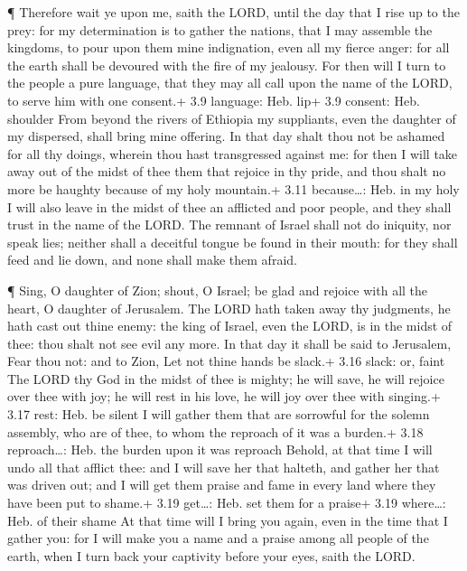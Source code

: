  ¶ Therefore wait ye upon me, saith the LORD, until the day
that I rise up to the prey: for my determination is to gather the
nations, that I may assemble the kingdoms, to pour upon them mine
indignation, even all my fierce anger: for all the earth shall be
devoured with the fire of my jealousy.  For then will I turn
to the people a pure language, that they may all call upon the name of
the LORD, to serve him with one consent.+ 3.9 language: Heb. lip+ 3.9
consent: Heb. shoulder  From beyond the rivers of Ethiopia
my suppliants, even the daughter of my dispersed, shall bring mine
offering.  In that day shalt thou not be ashamed for all
thy doings, wherein thou hast transgressed against me: for then I will
take away out of the midst of thee them that rejoice in thy pride, and
thou shalt no more be haughty because of my holy mountain.+ 3.11
because\ldots: Heb. in my holy  I will also leave in the
midst of thee an afflicted and poor people, and they shall trust in the
name of the LORD.  The remnant of Israel shall not do
iniquity, nor speak lies; neither shall a deceitful tongue be found in
their mouth: for they shall feed and lie down, and none shall make them
afraid.

 ¶ Sing, O daughter of Zion; shout, O Israel; be glad and
rejoice with all the heart, O daughter of Jerusalem.  The
LORD hath taken away thy judgments, he hath cast out thine enemy: the
king of Israel, even the LORD, is in the midst of thee: thou shalt not
see evil any more.  In that day it shall be said to
Jerusalem, Fear thou not: and to Zion, Let not thine hands be slack.+
3.16 slack: or, faint  The LORD thy God in the midst of
thee is mighty; he will save, he will rejoice over thee with joy; he
will rest in his love, he will joy over thee with singing.+ 3.17 rest:
Heb. be silent  I will gather them that are sorrowful for
the solemn assembly, who are of thee, to whom the reproach of it was a
burden.+ 3.18 reproach\ldots: Heb. the burden upon it was reproach
 Behold, at that time I will undo all that afflict thee:
and I will save her that halteth, and gather her that was driven out;
and I will get them praise and fame in every land where they have been
put to shame.+ 3.19 get\ldots: Heb. set them for a praise+ 3.19
where\ldots: Heb. of their shame  At that time will I bring
you again, even in the time that I gather you: for I will make you a
name and a praise among all people of the earth, when I turn back your
captivity before your eyes, saith the LORD.
